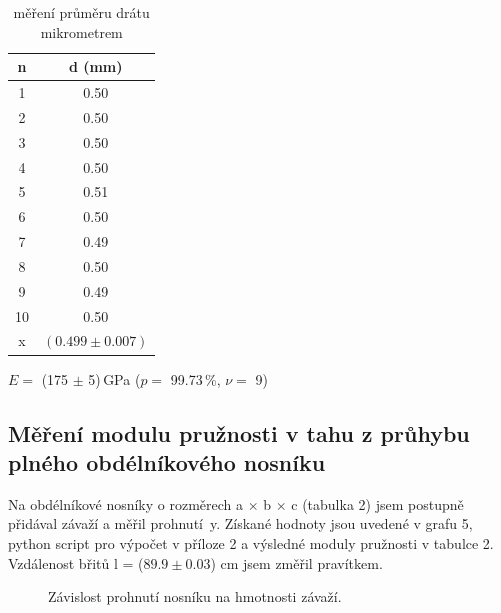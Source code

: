 \documentclass[a4paper,11pt]{article}
\newcommand{\vrn}[6]{\ensuremath{#1 =} (#2 $\pm$ #3)\,#4 ($p=$ #5\,\%, $\nu=$ #6)}
\begin{document}
\begin{table}[htpb]
  \begin{minipage}{0.62\linewidth}
    \centering
    
  \end{minipage}
  \hfill
  \begin{minipage}{0.30\linewidth}
    \centering
    \begin{tabular}{|c|c|}
      \hline
      n & d (mm) \\
      \hline
      1 & 0.50 \\
      2 & 0.50 \\
      3 & 0.50 \\
      4 & 0.50 \\
      5 & 0.51 \\
      6 & 0.50 \\
      7 & 0.49 \\
      8 & 0.50 \\
      9 & 0.49 \\
      10 & 0.50 \\
      \hline
      x & $(0.499 \pm 0.007)$ \\
      \hline
    \end{tabular}
    \caption{měření průměru drátu mikrometrem}
  \end{minipage}
\end{table}
\vspace{-10pt}
\begin{center}
 \vrn{E}{175}{5}{GPa}{99.73}{9} 
\end{center}

\subsection{Měření modulu pružnosti v tahu z průhybu plného obdélníkového nosníku}

Na obdélníkové nosníky o rozměrech a $\times$ b $\times$ c (tabulka 2) jsem postupně přidával závaží a měřil prohnutí~y. Získané hodnoty jsou uvedené v grafu 5, python script pro výpočet v příloze 2 a výsledné moduly pružnosti v tabulce 2. Vzdálenost břitů l = ($89.9\pm0.03$) cm jsem změřil pravítkem.

\begin{figure}[htpb]
  \centering
  
  \caption{Závislost prohnutí nosníku na hmotnosti závaží.}
\end{figure}
\end{document}
